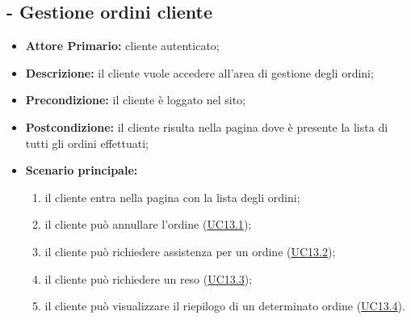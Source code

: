 \subsection{ - Gestione ordini cliente}
\begin{itemize}
    \item \textbf{Attore Primario:} cliente autenticato;
    \item \textbf{Descrizione:} il cliente vuole accedere all'area di gestione degli ordini;
    \item \textbf{Precondizione:} il cliente è loggato nel sito;
    \item \textbf{Postcondizione:} il cliente risulta nella pagina dove è presente la lista di tutti gli ordini effettuati;
    \item \textbf{Scenario principale:}
    \begin{enumerate}
        \item il cliente entra nella pagina con la lista degli ordini;
        \item il cliente può annullare l'ordine (\hyperref[UC13.1]{UC13.1});
        \item il cliente può richiedere assistenza per un ordine (\hyperref[UC13.2]{UC13.2});
        \item il cliente può richiedere un reso (\hyperref[UC13.3]{UC13.3});
        \item il cliente può visualizzare il riepilogo di un determinato ordine (\hyperref[UC13.4]{UC13.4}).
    \end{enumerate}
\end{itemize}

\stepsubUserCase
